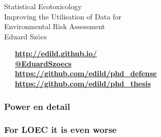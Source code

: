 \documentclass[
	12pt
	]{beamer}
\begin{document}
\begin{frame}[standout]
	\frametitle{}

	\vspace{1em}
	\Huge{Statistical Ecotoxicology} \\[0.3em]
	\normalsize{Improving the Utilisation of Data for \\ Environmental Risk Assessment} \\[1em]

	\footnotesize
	Eduard Szöcs \\[3em]
\begin{flushleft}
	\faLaptop~~~\textbf{\href{http://edild.github.io/}{http://edild.github.io/ }}\\[.5em]
	\faTwitter~~~\textbf{\href{http://twitter.com/EduardSzoecs}{@EduardSzoecs}} 	\\[0.5em]
	\faFilePowerpointO~~~\textbf{\href{https://github.com/edild/phd_defense}{https://github.com/edild/phd\_defense}}\\[0.5em]
	\faBook~~~\textbf{\href{https://github.com/edild/phd_thesis}{https://github.com/edild/phd\_thesis}}\\[3em]
\end{flushleft}

	\begin{center}\ccbysa\end{center} 
\end{frame}




\appendix

\begin{frame}
\frametitle{Power en detail}
	\begin{adjustbox}{max totalsize={\textwidth}{\textheight}}
				
	\end{adjustbox}
\end{frame}


\begin{frame}
\frametitle{For LOEC it is even worse}
	\begin{adjustbox}{max totalsize={\textwidth}{\textheight}}
				
	\end{adjustbox}
\end{frame}
\end{document}
